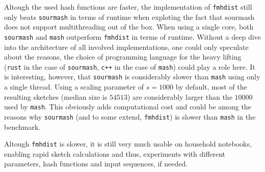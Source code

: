 Altough the used hash functions are faster, the implementation of
\texttt{fmhdist} still only beats \texttt{sourmash} in terms of runtime when
exploting the fact that sourmash does not support multithreading out of the box.
When using a single core, both \texttt{sourmash} and \texttt{mash} outperform
\texttt{fmhdist} in terms of runtime. Without a deep dive into the architecture
of all involved implementations, one could only speculate about the reasons, the
choice of programming language for the heavy lifting (\texttt{rust} in the case
of \texttt{sourmash}, \texttt{c++} in the case of \texttt{mash}) could play a
role here. It is interesting, however, that \texttt{sourmash} is considerably
slower than \texttt{mash} using only a single thread. Using a scaling parameter
of $s=1000$ by default, most of the resulting sketches (median size is $54513$)
are considerably larger than the $10000$ used by \texttt{mash}. This obviously
adds computational cost and could be among the reasons why \texttt{sourmash}
(and to some extend, \texttt{fmhdist}) is slower than \texttt{mash} in the
benchmark.

Altough \texttt{fmhdist} is slower, it is still very much usable on household
notebooks, enabling rapid sketch calculations and thus, experiments with
different parameters, hash functions and input sequences, if needed.

